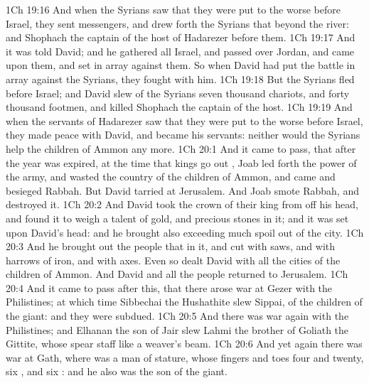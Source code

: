 \vs 1Ch 19:16 And when the Syrians saw that they were put to the worse before Israel, they sent messengers, and drew forth the Syrians that  beyond the river: and Shophach the captain of the host of Hadarezer  before them.
\vs 1Ch 19:17 And it was told David; and he gathered all Israel, and passed over Jordan, and came upon them, and set  in array against them. So when David had put the battle in array against the Syrians, they fought with him.
\vs 1Ch 19:18 But the Syrians fled before Israel; and David slew of the Syrians seven thousand  chariots, and forty thousand footmen, and killed Shophach the captain of the host.
\vs 1Ch 19:19 And when the servants of Hadarezer saw that they were put to the worse before Israel, they made peace with David, and became his servants: neither would the Syrians help the children of Ammon any more.
\vs 1Ch 20:1 And it came to pass, that after the year was expired, at the time that kings go out , Joab led forth the power of the army, and wasted the country of the children of Ammon, and came and besieged Rabbah. But David tarried at Jerusalem. And Joab smote Rabbah, and destroyed it.
\vs 1Ch 20:2 And David took the crown of their king from off his head, and found it to weigh a talent of gold, and  precious stones in it; and it was set upon David's head: and he brought also exceeding much spoil out of the city.
\vs 1Ch 20:3 And he brought out the people that  in it, and cut  with saws, and with harrows of iron, and with axes. Even so dealt David with all the cities of the children of Ammon. And David and all the people returned to Jerusalem.
\vs 1Ch 20:4 And it came to pass after this, that there arose war at Gezer with the Philistines; at which time Sibbechai the Hushathite slew Sippai,  of the children of the giant: and they were subdued.
\vs 1Ch 20:5 And there was war again with the Philistines; and Elhanan the son of Jair slew Lahmi the brother of Goliath the Gittite, whose spear staff  like a weaver's beam.
\vs 1Ch 20:6 And yet again there was war at Gath, where was a man of  stature, whose fingers and toes  four and twenty, six , and six : and he also was the son of the giant.
